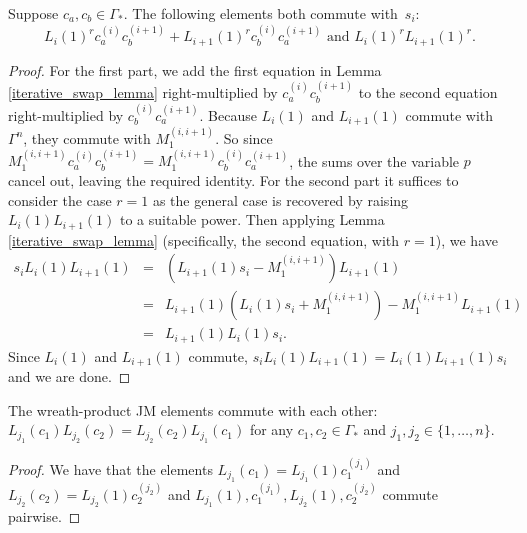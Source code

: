 \begin{proposition} \label{special_commuting_proposition}
Suppose $c_a, c_b \in \Gamma_*$. The following elements both commute with~$s_i$:
 \[
 L_i(1)^r c_a^{(i)}c_b^{(i+1)} + L_{i+1}(1)^r c_b^{(i)} c_a^{(i+1)}\text{ and }L_i(1)^r L_{i+1}(1)^r.
 \]
\end{proposition}

\begin{proof}
For the first part, we add the first equation in Lemma \ref{iterative_swap_lemma} right-multiplied by $c_a^{(i)}c_b^{(i+1)}$ to the second equation right-multiplied by $ c_b^{(i)}c_a^{(i+1)}$. Because $L_i(1)$ and $L_{i+1}(1)$ commute with $\Gamma^n$, they commute with $M_1^{(i,i+1)}$. So since $M_1^{(i,i+1)}  c_a^{(i)}c_b^{(i+1)} =  M_1^{(i,i+1)}c_b^{(i)}c_a^{(i+1)}$, the sums over the variable $p$ cancel out, leaving the required identity. For the second part it suffices to consider the case $r=1$ as the general case is recovered by raising $L_i(1)L_{i+1}(1)$ to a suitable power. Then applying Lemma \ref{iterative_swap_lemma} (specifically, the second equation, with $r=1$), we have
\begin{eqnarray*}
s_i L_i(1) L_{i+1}(1) &=& (L_{i+1}(1)s_i - M_1^{(i,i+1)}) L_{i+1}(1) \\
&=& L_{i+1}(1) (L_i(1)s_i + M_1^{(i,i+1)}) - M_1^{(i,i+1)} L_{i+1}(1) \\
&=& L_{i+1}(1)L_i(1)s_i.
\end{eqnarray*}
Since $L_i(1)$ and $L_{i+1}(1)$ commute, $s_i L_i(1)L_{i+1}(1) = L_{i}(1)L_{i+1}(1)s_i$ and we are done.\qedhere
\end{proof}


\begin{proposition} \label{gen_JM_elts_commute}
The wreath-product JM elements commute with each other: $L_{j_1}(c_1) L_{j_2}(c_2)=L_{j_2}(c_2) L_{j_1}(c_1)$ for any $c_1, c_2 \in \Gamma_*$ and $j_1, j_2 \in \{1,\ldots, n\}$.
\end{proposition}
\begin{proof}
We have that the elements $L_{j_1}(c_1) = L_{j_1}(1) c_1^{(j_1)}$ and $L_{j_2}(c_2) = L_{j_2}(1) c_2^{(j_2)}$ and $L_{j_1}(1), c_1^{(j_1)}, L_{j_2}(1), c_2^{(j_2)}$ commute pairwise.
\end{proof}






